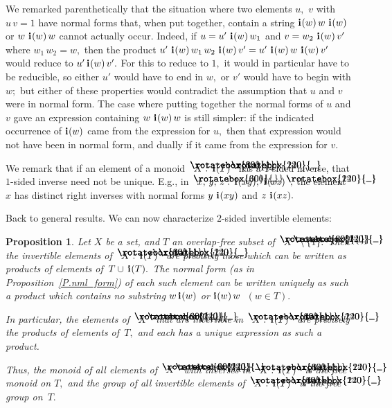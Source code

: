\documentclass{amsart}
\newtheorem{proposition}[equation]{Proposition}
\numberwithin{equation}{section}
\newcommand{\I}{\mathbf{i}\hspace{.05em}}
\newcommand{\langl}{\begin{picture}(.51em,1em)
\put(.11em,.33em){\rotatebox{60}{\line(1,0){.55em}}}
\put(.11em,.33em){\rotatebox{300}{\line(1,0){.55em}}}
\end{picture}}
\newcommand{\rangl}{\begin{picture}(.5em,1em)
\put(.09em,.33em){\rotatebox{120}{\line(1,0){.55em}}}
\put(.09em,.33em){\rotatebox{240}{\line(1,0){.55em}}}
\end{picture}}
\begin{document}
We remarked parenthetically that the situation where two elements
$u,$ $v$ with $u\,v=1$ have normal forms that, when
put together, contain
a string $\I(w)\,w\,\,\I(w)$ or $w\,\,\I(w)\,w$ cannot actually occur.
Indeed, if $u=u'\,\,\I(w)\,w_1$ and $v=w_2\,\,\I(w)\,v'$
where $w_1\,w_2=w,$ then the
product $u'\,\,\I(w)\,w_1\,w_2\,\,\I(w)\,v'=u'\,\,\I(w)\,w\,\,\I(w)\,v'$
would reduce to $u'\,\I(w)\,v'.$
For this to reduce to $1,$ it would in particular have
to be reducible, so either $u'$ would have to end
in $w,$ or $v'$ would have to begin with $w;$ but either
of these properties would contradict the assumption that
$u$ and $v$ were in normal form.
The case where putting together the normal forms
of $u$ and $v$ gave an expression containing $w\,\,\I(w)\,w$
is still simpler: if the indicated
occurrence of $\I(w)$ came from the expression for $u,$ then that
expression would not have been in normal form, and dually
if it came from the expression for $v.$

We remark that if an element of a
monoid $\langl X:\,\I(T)\rangl$ has a $\!1\!$-sided
inverse, that $\!1\!$-sided inverse need not be unique.
E.g., in $\langl x,\,y,\,z:\,\I(xy),\,\,\I(xz)\rangl,$
the element $x$ has distinct right inverses
with normal forms $y\,\,\I(xy)$ and $z\,\,\I(xz).$

Back to general results.
We can now characterize $\!2\!$-sided invertible elements:

\begin{proposition}\label{P.inv}
Let $X$ be a set, and $T$ an overlap-free subset
of $\langl X\rangl\setminus\{1\}.$
Then the invertible elements
of $\langl X:\,\I(T)\rangl$ are precisely those which can be
written as products of elements of~$T\cup\,\I(T).$
The normal form {\rm(}as in Proposition~\ref{P.nml_form}{\rm)}
of each such element can be written uniquely as such a product
which contains no substring $w\,\I(w)$ or $\I(w)\,w$~$(w\in T).$

In particular, the elements of $\langl X\rangl$ that are invertible in
$\langl X:\,\I(T)\rangl$ are precisely the products of
elements of~$T,$ and each has a unique
expression as such a product.

Thus, the monoid of all elements of $\langl X\rangl$
with inverses in $\langl X:\,\I(T)\rangl$
is the free monoid on $T,$ and the group of all invertible elements
of $\langl X:\,\I(T)\rangl$ is the free group on~$T.$
\end{proposition}
\end{document}

